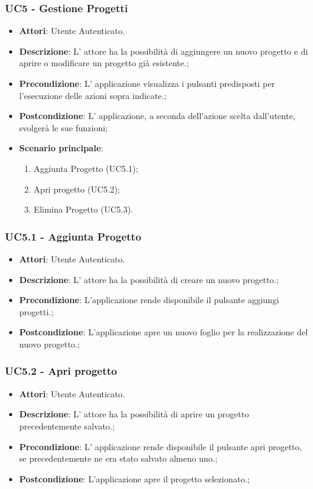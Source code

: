 \subsubsection{UC5 - Gestione Progetti} 
\label{sssec:UC5} 
\begin{itemize} 
\item \textbf{Attori}: Utente Autenticato.
\item \textbf{Descrizione}: L’ attore ha la possibilità di aggiungere un nuovo progetto e di aprire o modificare un progetto già esistente.;
\item \textbf{Precondizione}: L’ applicazione visualizza i pulsanti predisposti per l’esecuzione delle azioni sopra indicate.;
\item \textbf{Postcondizione}: L’ applicazione, a seconda dell’azione scelta dall’utente, svolgerà le sue funzioni;
\item \textbf{Scenario principale}: \begin{enumerate}\item Aggiunta Progetto (UC5.1);\item Apri progetto (UC5.2);\item Elimina Progetto (UC5.3). 
 \end{enumerate}
\end{itemize} 
\subsubsection{UC5.1 - Aggiunta Progetto} 
\label{sssec:UC5.1} 
\begin{itemize} 
\item \textbf{Attori}: Utente Autenticato.
\item \textbf{Descrizione}: L’ attore ha la possibilità di creare un nuovo progetto.;
\item \textbf{Precondizione}: L’applicazione rende disponibile il pulsante aggiungi progetti.;
\item \textbf{Postcondizione}: L’applicazione apre un nuovo foglio per la realizzazione del nuovo progetto.;
\end{itemize} 
\subsubsection{UC5.2 - Apri progetto} 
\label{sssec:UC5.2} 
\begin{itemize} 
\item \textbf{Attori}: Utente Autenticato.
\item \textbf{Descrizione}: L’ attore ha la possibilità di aprire un progetto precedentemente salvato.;
\item \textbf{Precondizione}: L’ applicazione rende disponibile il pulsante apri progetto, se precedentemente ne era stato salvato almeno uno.;
\item \textbf{Postcondizione}: L’applicazione apre il progetto selezionato.;
\end{itemize} 
